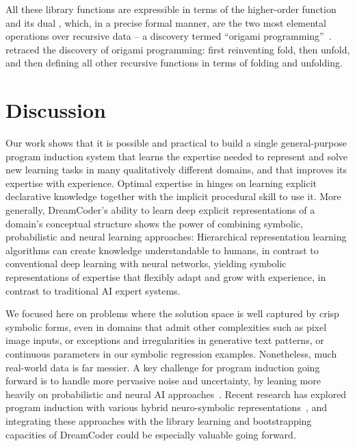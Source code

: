 \documentclass[12pt]{article}
\begin{document}
All these library functions are expressible in terms of the higher-order function  and its dual , which, in a precise formal manner, are the two most elemental operations over recursive data --
a discovery termed ``origami programming''~\cite{gibbons2003origami}.
\system retraced the discovery of origami programming:
first reinventing fold,
then unfold,
and then defining all other recursive functions in terms of folding and unfolding.  %

\section*{Discussion}
Our work shows that it is possible and practical to build a single general-purpose program induction system that learns the expertise needed to represent and solve new learning tasks in many qualitatively different domains, and that improves its expertise with experience. 
Optimal expertise in \system hinges on learning explicit declarative knowledge together with the implicit procedural skill to use it. More generally, DreamCoder's ability to learn deep explicit representations of a domain's conceptual structure shows the power of combining symbolic, probabilistic and neural learning approaches: Hierarchical representation learning algorithms can create knowledge understandable to humans, in contrast to conventional deep learning with
neural networks, yielding symbolic representations of expertise that flexibly adapt and grow with experience, in contrast to traditional AI expert systems. 

We focused here on problems where the solution space is well captured by crisp symbolic forms, even in domains that admit other complexities such as pixel image inputs, or exceptions and irregularities in
generative text patterns, or continuous parameters in our symbolic regression examples. Nonetheless, much real-world data is far messier. A key challenge for program induction going forward is to handle more pervasive noise and uncertainty, by leaning more heavily on probabilistic and neural AI approaches~\cite{ellis2017learning,lake2015human,graves2016hybrid}.   Recent research has explored program induction with various hybrid neuro-symbolic representations~\cite{valkov2018houdini,andreas2016neural,manhaeve2018deepproblog,young2019learning,feinman2020generating}, and integrating these approaches with the library learning and bootstrapping capacities of DreamCoder could be especially valuable going forward.  
\end{document}

